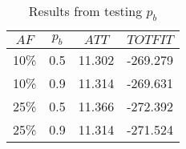     \begin{table}[H]
    \centering
    \begin{tabular}{|c|c||c|c|}
    \hline
    $AF$ & $p_b$ & $ATT$ & $TOTFIT$\\
    \hline
    10\% & 0.5 & 11.302 & -269.279 \\
    10\% & 0.9 & 11.314 & -269.631 \\
    25\% & 0.5 & 11.366 & -272.392 \\
    25\% & 0.9 & 11.314 & -271.524 \\
    \hline
    \end{tabular}
    \caption {Results from testing $p_b$}
    \label{table:pb_testing}
    \end{table}






